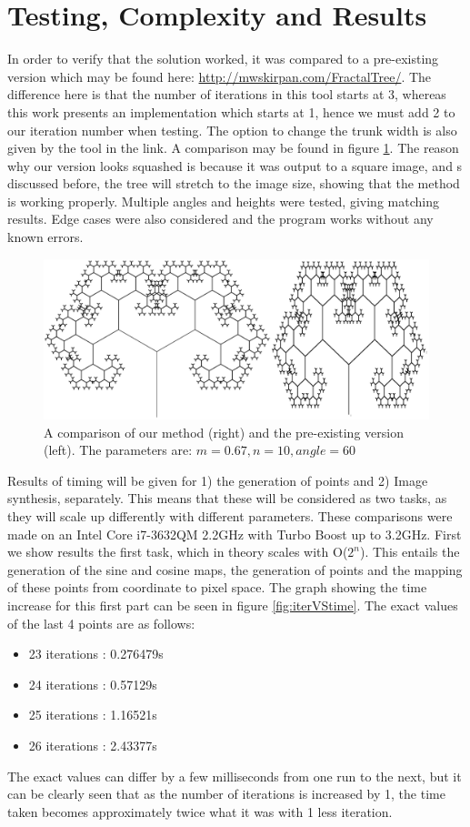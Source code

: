 \section{Testing, Complexity and Results} \label{results}
In order to verify that the solution worked, it was compared to a pre-existing version which may be found here: \url{http://mwskirpan.com/FractalTree/}. The difference here is that the number of iterations in this tool starts at 3, whereas this work presents an implementation which starts at 1, hence we must add 2 to our iteration number when testing. The option to change the trunk width is also given by the tool in the link. A comparison may be found in figure \ref{fig:comparison}. The reason why our version looks squashed is because it was output to a square image, and s discussed before, the tree will stretch to the image size, showing that the method is working properly. Multiple angles and heights were tested, giving matching results. Edge cases were also considered and the program works without any known errors.

\begin{figure}
	\label{fig:comparison}
	\includegraphics[width=\linewidth]{Images/Comparison.png}
	\centering
	\caption{A comparison of our method (right) and the pre-existing version (left). The parameters are: $m=0.67, n=10, angle=60$}
\end{figure}

Results of timing will be given for 1) the generation of points and 2) Image synthesis, separately. This means that these will be considered as two tasks, as they will scale up differently with different parameters. These comparisons were made on an Intel Core i7-3632QM 2.2GHz with Turbo Boost up to 3.2GHz. First we show results the first task, which in theory scales with O($2^n$). This entails the generation of the sine and cosine maps, the generation of points and the mapping of these points from coordinate to pixel space. The graph showing the time increase for this first part can be seen in figure \ref{fig:iterVStime}. The exact values of the last 4 points are as follows:
\begin{itemize}
	\item 23 iterations : 0.276479s
	\item 24 iterations : 0.57129s
	\item 25 iterations : 1.16521s
	\item 26 iterations : 2.43377s
\end{itemize}
The exact values can differ by a few milliseconds from one run to the next, but it can be clearly seen that as the number of iterations is increased by 1, the time taken becomes approximately twice what it was with 1 less iteration.

